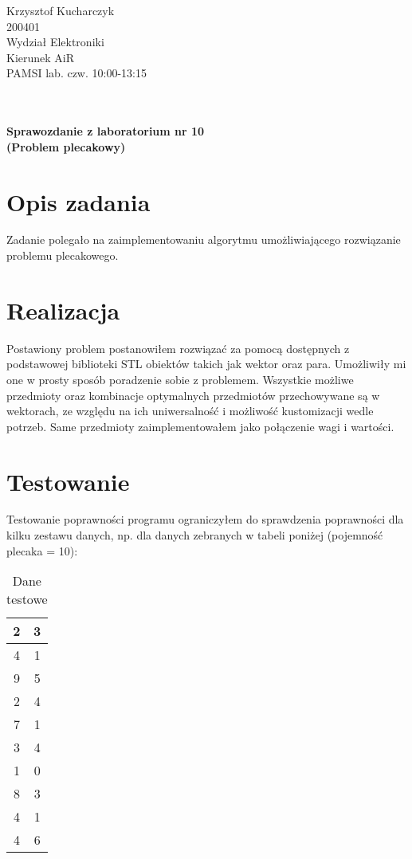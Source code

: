\documentclass[a4paper,12pt]{article}
\begin{document}
{\raggedleft{}Krzysztof Kucharczyk}\\200401\\Wydział Elektroniki\\Kierunek AiR
\\PAMSI lab. czw. 10:00-13:15\\\\\\
\begin{center} 
	\textbf{Sprawozdanie z laboratorium nr 10\\(Problem plecakowy)}
\end{center}

\section{Opis zadania}

Zadanie polegało na zaimplementowaniu algorytmu umożliwiającego rozwiązanie problemu plecakowego.
\section{Realizacja}

Postawiony problem postanowiłem rozwiązać za pomocą dostępnych z podstawowej biblioteki STL obiektów takich jak wektor oraz para. Umożliwiły mi one w prosty sposób poradzenie sobie z problemem. Wszystkie możliwe przedmioty oraz kombinacje optymalnych przedmiotów przechowywane są w wektorach, ze względu na ich uniwersalność i możliwość kustomizacji wedle potrzeb. Same przedmioty zaimplementowałem jako połączenie wagi i wartości.

\section{Testowanie}

Testowanie poprawności programu ograniczyłem do sprawdzenia poprawności dla kilku zestawu danych, np. dla danych zebranych w tabeli poniżej (pojemność plecaka = 10):

\begin{table}[ht] 
\caption{Dane testowe} 
\centering 
\begin{tabular}{|c|c|}

\hline
\hline
2 & 3 \\
\hline
4 & 1 \\
\hline
9 & 5 \\
\hline
2 & 4 \\
\hline
7 & 1 \\
\hline
3 & 4 \\
\hline
1 & 0 \\
\hline
8 & 3 \\
\hline
4 & 1 \\
\hline
4 & 6 \\
\hline \hline

\end{tabular}
\end{table}
\end{document}
